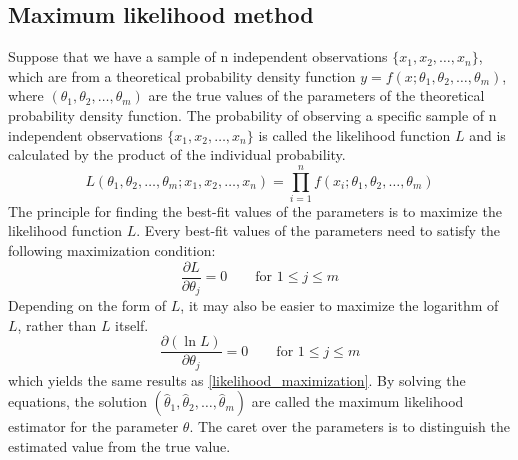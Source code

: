 \documentclass[12pt,a4paper]{report}
\begin{document}
\subsection{Maximum likelihood method \cite{stat_2}}
Suppose that we have a sample of n independent observations $\{ x_1, x_2, \dots , x_n \}$, which are from a theoretical probability density function $y = f(x;\theta_1,\theta_2,\dots,\theta_m)$, where $(\theta_1,\theta_2,\dots,\theta_m)$ are the true values of the parameters of the theoretical probability density function.
The probability of observing a specific sample of n independent observations $\{ x_1, x_2, \dots , x_n \}$ is called the likelihood function $L$ and is calculated by the product of the individual probability.
\begin{equation}
L(\theta_1,\theta_2,\dots,\theta_m;x_1,x_2,\dots,x_n) = \prod_{i = 1}^{n} f(x_i;\theta_1,\theta_2,\dots,\theta_m)
\end{equation}
The principle for finding the best-fit values of the parameters is to maximize the likelihood function $L$.
Every best-fit values of the parameters need to satisfy the following maximization condition:
\begin{equation}  \label{likelihood_maximization}
\frac{\partial L}{\partial \theta_j} = 0 \qquad \text{for } 1 \leq  j \leq m
\end{equation}
Depending on the form of $L$, it may also be easier to maximize the logarithm of $L$, rather than $L$ itself.
\begin{equation}
\frac{\partial ( \ln L )}{\partial \theta_j} = 0 \qquad \text{for } 1 \leq  j \leq m
\end{equation}
which yields the same results as \ref{likelihood_maximization}.
By solving the equations, the solution $(\hat{\theta}_1,\hat{\theta}_2,\dots,\hat{\theta}_m)$ are called the maximum likelihood estimator for the parameter $\theta$.
The caret over the parameters is to distinguish the estimated value from the true value.
\end{document}
